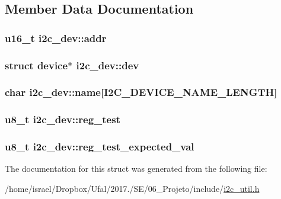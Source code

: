 \subsection{Member Data Documentation}
\hypertarget{structi2c__dev_ae9308c72bfb06fea21da16f47b4e679b}{
\subsubsection[{addr}]{\setlength{\rightskip}{0pt plus 5cm}u16\-\_\-t i2c\-\_\-dev\-::addr}}\label{structi2c__dev_ae9308c72bfb06fea21da16f47b4e679b}
\hypertarget{structi2c__dev_ac4b6ba60143ff90df0ddc847deed7499}{
\subsubsection[{dev}]{\setlength{\rightskip}{0pt plus 5cm}struct device$\ast$ i2c\-\_\-dev\-::dev}}\label{structi2c__dev_ac4b6ba60143ff90df0ddc847deed7499}
\hypertarget{structi2c__dev_aa3e3ecd39bec0681b174122b4a5e91e5}{
\subsubsection[{name}]{\setlength{\rightskip}{0pt plus 5cm}char i2c\-\_\-dev\-::name\mbox{[}{\bf I2\-C\-\_\-\-D\-E\-V\-I\-C\-E\-\_\-\-N\-A\-M\-E\-\_\-\-L\-E\-N\-G\-T\-H}\mbox{]}}}\label{structi2c__dev_aa3e3ecd39bec0681b174122b4a5e91e5}
\hypertarget{structi2c__dev_a20bd6a8e30216a5866cfc70fec9a3203}{
\subsubsection[{reg\-\_\-test}]{\setlength{\rightskip}{0pt plus 5cm}u8\-\_\-t i2c\-\_\-dev\-::reg\-\_\-test}}\label{structi2c__dev_a20bd6a8e30216a5866cfc70fec9a3203}
\hypertarget{structi2c__dev_a46e0fffcf23e10012b1f5afc774088e7}{
\subsubsection[{reg\-\_\-test\-\_\-expected\-\_\-val}]{\setlength{\rightskip}{0pt plus 5cm}u8\-\_\-t i2c\-\_\-dev\-::reg\-\_\-test\-\_\-expected\-\_\-val}}\label{structi2c__dev_a46e0fffcf23e10012b1f5afc774088e7}


The documentation for this struct was generated from the following file\-:\begin{DoxyCompactItemize}
\item 
/home/israel/\-Dropbox/\-Ufal/2017./\-S\-E/06\-\_\-\-Projeto/include/\hyperlink{i2c__util_8h}{i2c\-\_\-util.\-h}\end{DoxyCompactItemize}
